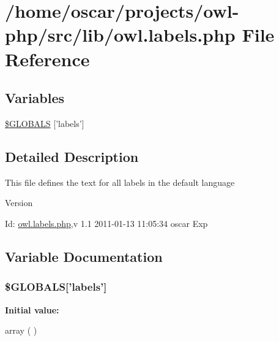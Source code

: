 \section{/home/oscar/projects/owl-\/php/src/lib/owl.labels.php File Reference}
\label{owl_8labels_8php}
\subsection*{Variables}
\begin{DoxyCompactItemize}
\item 
\hyperlink{owl_8labels_8php_a49e8feb96fae9cb6655df44ebad3ca2b}{\$GLOBALS} \mbox{[}'labels'\mbox{]}
\end{DoxyCompactItemize}


\subsection{Detailed Description}
This file defines the text for all labels in the default language \begin{DoxyVersion}{Version}

\end{DoxyVersion}
\begin{DoxyParagraph}{Id:}
\hyperlink{owl_8labels_8php}{owl.labels.php},v 1.1 2011-\/01-\/13 11:05:34 oscar Exp 
\end{DoxyParagraph}


\subsection{Variable Documentation}
\subsubsection[{\$GLOBALS}]{\setlength{\rightskip}{0pt plus 5cm}\$GLOBALS\mbox{[}'labels'\mbox{]}}\label{owl_8labels_8php_a49e8feb96fae9cb6655df44ebad3ca2b}
{\bfseries Initial value:}
\begin{DoxyCode}
 array (
)
\end{DoxyCode}
